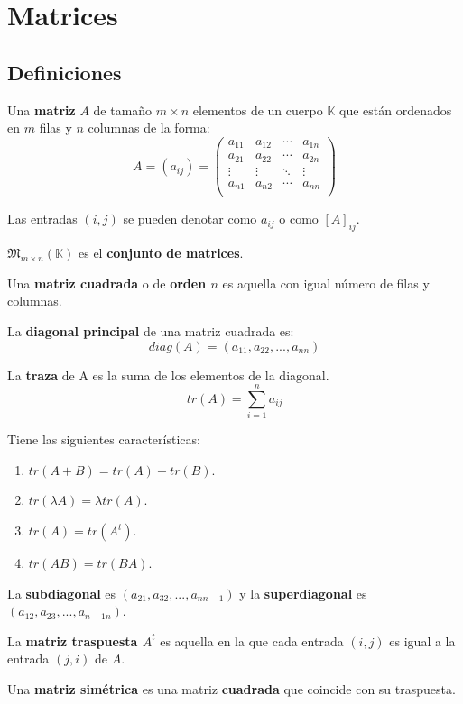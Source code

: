 \chapter{Matrices}

\section{Definiciones}

Una \textbf{matriz} $A$ de tamaño $m \times n$ elementos de un cuerpo $\mathbb{K}$ que están ordenados en $m$ filas y $n$ columnas de la forma:
\[
A=(a_{ij})=\begin{pmatrix}
a_{11} & a_{12} & \cdots & a_{1n}  \\
a_{21} & a_{22} & \cdots & a_{2n}  \\
\vdots & \vdots & \ddots & \vdots  \\
a_{n1} & a_{n2} & \cdots & a_{nn}  \\
\end{pmatrix}
\]

Las entradas $(i,j)$ se pueden denotar como $a_{ij}$ o como $[A]_{ij}$.

$\mathfrak{M}_{m \times n}(\mathbb{K})$ es el \textbf{conjunto de matrices}.

Una \textbf{matriz cuadrada} o de \textbf{orden $n$} es aquella con igual número de filas y columnas.

La \textbf{diagonal principal} de una matriz cuadrada es:
\[
diag(A) = (a_{11}, a_{22},...,a_{nn})
\]

La \textbf{traza} de A es la suma de los elementos de la diagonal.
\[
tr(A) = \sum_{i=1}^{n}{a_{ij}}
\]

Tiene las siguientes características:
\begin{enumerate}
\item $tr(A+B)=tr(A)+tr(B)$.
\item $tr(\lambda A)=\lambda tr(A)$.
\item $tr(A)=tr(A^t)$.
\item $tr(AB)=tr(BA)$.
\end{enumerate}

La \textbf{subdiagonal} es $(a_{21}, a_{32},...,a_{nn-1})$ y la \textbf{superdiagonal} es $(a_{12}, a_{23},...,a_{n-1n})$.

La \textbf{matriz traspuesta $A^t$} es aquella en la que cada entrada $(i,j)$ es igual a la entrada $(j,i)$ de $A$.

Una \textbf{matriz simétrica} es una matriz \textbf{cuadrada} que coincide con su traspuesta.

